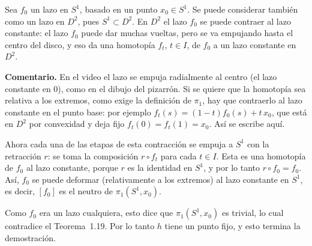 \documentclass[11pt]{article}
\begin{document}
Sea $f_0$ un lazo en $S^1$, basado en un punto $x_0\in S^1$. Se puede considerar también como un lazo en $D^2$, pues $S^1\subset D^2$. En $D^2$ el lazo $f_0$ se puede contraer al lazo constante: el lazo $f_0$ puede dar muchas vueltas, pero se va empujando hasta el centro del disco, y eso da una homotopía $f_t$, $t\in I$, de $f_0$ a un lazo constante en $D^2$.

\medskip\noindent\textbf{Comentario.} En el video el lazo se empuja radialmente al centro (el lazo constante en $0$), como en el dibujo del pizarrón. Si se quiere que la homotopía sea relativa a los extremos, como exige la definición de $\pi_1$, hay que contraerlo al lazo constante en el punto base: por ejemplo $f_t(s)=(1-t)f_0(s)+t\,x_0$, que está en $D^2$ por convexidad y deja fijo $f_t(0)=f_t(1)=x_0$. Así se escribe aquí.

\medskip
Ahora cada una de las etapas de esta contracción se empuja a $S^1$ con la retracción $r$: se toma la composición $r\circ f_t$ para cada $t\in I$. Esta es una homotopía de $f_0$ al lazo constante, porque $r$ es la identidad en $S^1$, y por lo tanto $r\circ f_0=f_0$. Así, $f_0$ se puede deformar (relativamente a los extremos) al lazo constante en $S^1$, es decir, $[f_0]$ es el neutro de $\pi_1(S^1,x_0)$.

Como $f_0$ era un lazo cualquiera, esto dice que $\pi_1(S^1,x_0)$ es trivial, lo cual contradice el Teorema~1.19. Por lo tanto $h$ tiene un punto fijo, y esto termina la demostración.

\begin{erratas}
\end{erratas}
\end{document}
